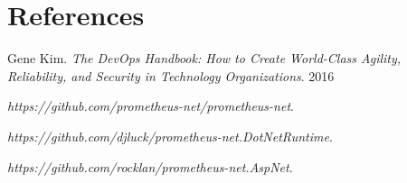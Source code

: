\section{References}

\begin{thebibliography}{9}
Gene Kim.
\textit{The DevOps Handbook: How to Create World-Class Agility, Reliability, and Security in Technology Organizations}. 
2016

\textit{https://github.com/prometheus-net/prometheus-net}.

\textit{https://github.com/djluck/prometheus-net.DotNetRuntime}.

\textit{https://github.com/rocklan/prometheus-net.AspNet}.

\end{thebibliography}
